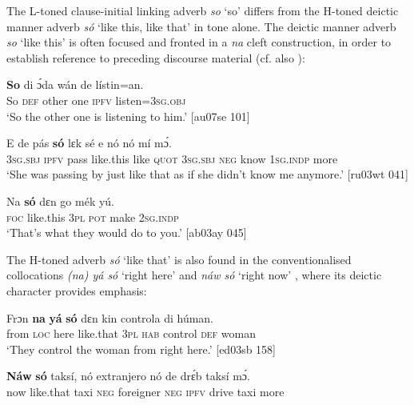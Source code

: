 The L-toned clause-initial linking adverb \textit{so} ‘so’  differs from the H-toned deictic manner adverb \textit{só} ‘like this, like that’  in tone alone. The deictic manner adverb \textit{so} ‘like this’ is often focused and fronted in a \textit{na} cleft construction, in order to establish reference to preceding discourse material  (cf. also ):


\ea%
    \label{ex:key:851}
    \gll \textbf{So}  di  ɔ́da    wán    de  lístin=an.\\
So  \textsc{def}  other  one    \textsc{ipfv}  listen=\textsc{3sg.obj}\\

\glt ‘So the other one is listening to him.’ [au07se 101]
\z


\ea%
    \label{ex:key:852}
    \gll E    de  pás  \textbf{só}    lɛk  sé    e    nó  nó    mí    mɔ́.\\
\textsc{3sg.sbj}  \textsc{ipfv}  pass  like.this  like  \textsc{quot}    \textsc{3sg.sbj}  \textsc{neg}  know  \textsc{1sg.indp}  more\\

\glt ‘She was passing by just like that as if she didn’t know me anymore.’ [ru03wt 041]
\z


\ea%
    \label{ex:key:853}
    \gll Na  \textbf{só}    dɛn  go  mék    yú.\\
\textsc{foc}  like.this  \textsc{3pl}  \textsc{pot}  make  \textsc{2sg.indp}\\

\glt ‘That’s what they would do to you.’ [ab03ay 045]
\z

The H-toned adverb \textit{só} ‘like that’ is also found in the conventionalised collocations \textit{(na) yá só} ‘right here’  and \textit{náw só} ‘right now’ , where its deictic character provides emphasis: 


\ea%
    \label{ex:key:854}
    \gll Frɔn    \textbf{na}  \textbf{yá}    \textbf{só}    dɛn  kin  controla  di  húman.\\
from  \textsc{loc}  here    like.that  \textsc{3pl}  \textsc{hab}  control  \textsc{def}  woman\\

\glt ‘They control the woman from right here.’ [ed03sb 158]
\z


\ea%
    \label{ex:key:855}
    \gll \textbf{Náw}    \textbf{só}    taksí,  nó  extranjero  nó  de  drɛ́b    taksí  mɔ́.\\
now    like.that  taxi    \textsc{neg}  foreigner  \textsc{neg}  \textsc{ipfv}  drive  taxi    more\\

